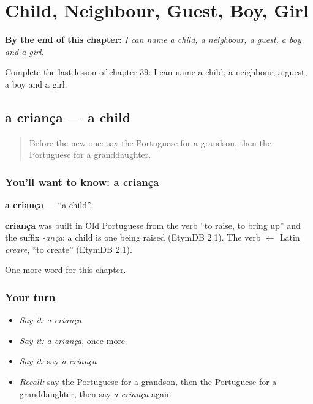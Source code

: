 
\chapter{Child, Neighbour, Guest, Boy, Girl}
\label{ch:pt-child-neighbour-guest-boy-girl}

\begin{chapteropening}
\textbf{By the end of this chapter:} \emph{I can name a child, a neighbour, a guest, a boy and a girl.}

Complete the last lesson of chapter 39: I can name a child, a neighbour, a guest, a boy and a girl.
\end{chapteropening}

\section[a criança]{a criança — a child}

\label{lesson:PT-C39-crianca}



\begin{quote}
Before the new one: say the Portuguese for a grandson, then the Portuguese for a granddaughter.
\end{quote}

\subsection*{You'll want to know: a criança}
\textbf{a criança} — \textquotedblleft{}a child\textquotedblright{}.

\begin{cousinweb}
\textbf{criança} was built in Old Portuguese from the verb \textquotedblleft{}to raise, to bring up\textquotedblright{} and the suffix \emph{-ança}: a child is one being raised (EtymDB 2.1). The verb $\leftarrow$ Latin \emph{creare}, \textquotedblleft{}to create\textquotedblright{} (EtymDB 2.1).
\end{cousinweb}

\begin{grammarlens}[title={What you've built}]
One more word for this chapter.
\end{grammarlens}

\subsection*{Your turn}
\begin{itemize}
\raggedright
  \item \emph{Say it:} \emph{a criança}
  \item \emph{Say it:} \emph{a criança}, once more
  \item \emph{Say it:} say \emph{a criança}
  \item \emph{Recall:} say the Portuguese for a grandson, then the Portuguese for a granddaughter, then say \emph{a criança} again
\end{itemize}

